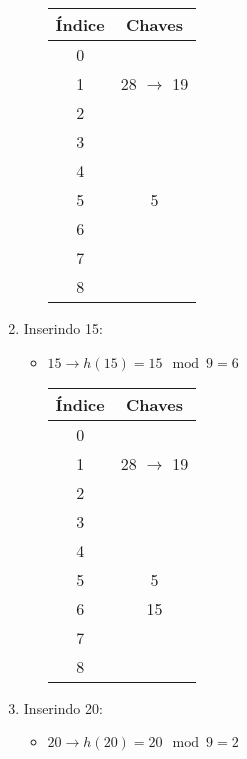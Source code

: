 \documentclass{article}
\begin{document}
\begin{enumerate}
\begin{itemize}
      \begin{center}
        \begin{tabular}{|c|c|}
        \hline
        \textbf{Índice} & \textbf{Chaves} \\
        \hline
        0 &  \\
        1 & 28 $\rightarrow$ 19\\
        2 & \\
        3 & \\
        4 &  \\
        5 & 5 \\
        6 & \\
        7 &  \\
        8 & \\
        \hline
        \end{tabular}
      \end{center}
    \end{itemize}
  \item Inserindo 15:
    \begin{itemize}
      \item \(15 \rightarrow h(15) = 15 \mod 9 = 6\)
          
      \begin{center}
        \begin{tabular}{|c|c|}
        \hline
        \textbf{Índice} & \textbf{Chaves} \\
        \hline
        0 &  \\
        1 & 28 $\rightarrow$ 19\\
        2 & \\
        3 & \\
        4 &  \\
        5 & 5 \\
        6 & 15\\
        7 &  \\
        8 & \\
        \hline
        \end{tabular}
      \end{center}
    \end{itemize}
  \item Inserindo 20:
    \begin{itemize}
      \item \(20 \rightarrow h(20) = 20 \mod 9 = 2\)
          

\end{itemize}
\end{enumerate}
\end{document}
